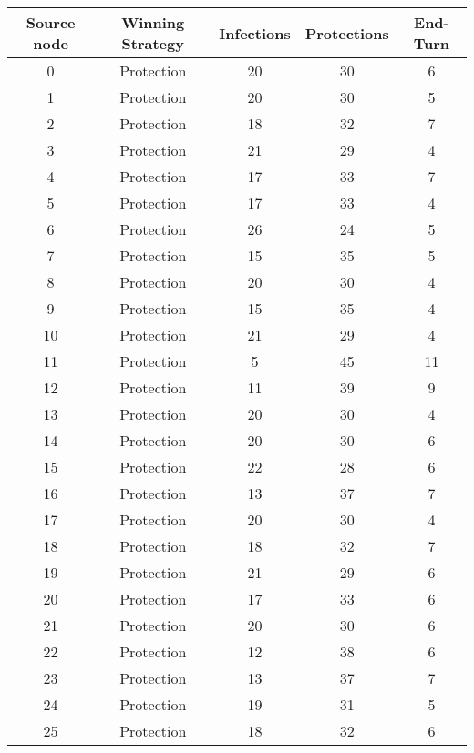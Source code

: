 \documentclass[results.tex]{subfiles}
\begin{document}
\begin{center}
  \begin{tabular}{| c || c | c | c | c |}
    \hline
    {\bfseries Source node} & {\bfseries Winning Strategy} & {\bfseries Infections} & {\bfseries Protections} & {\bfseries End-Turn} \\  %
    \hline\hline
    0 & Protection & 20 & 30 & 6 \\ 
    \hline
    1 & Protection & 20 & 30 & 5 \\ 
    \hline
    2 & Protection & 18 & 32 & 7 \\ 
    \hline
    3 & Protection & 21 & 29 & 4 \\ 
    \hline
    4 & Protection & 17 & 33 & 7 \\ 
    \hline
    5 & Protection & 17 & 33 & 4 \\ 
    \hline
    6 & Protection & 26 & 24 & 5 \\ 
    \hline
    7 & Protection & 15 & 35 & 5 \\ 
    \hline
    8 & Protection & 20 & 30 & 4 \\ 
    \hline
    9 & Protection & 15 & 35 & 4 \\ 
    \hline
    10 & Protection & 21 & 29 & 4 \\ 
    \hline
    11 & Protection & 5 & 45 & 11 \\ 
    \hline
    12 & Protection & 11 & 39 & 9 \\ 
    \hline
    13 & Protection & 20 & 30 & 4 \\ 
    \hline
    14 & Protection & 20 & 30 & 6 \\ 
    \hline
    15 & Protection & 22 & 28 & 6 \\ 
    \hline
    16 & Protection & 13 & 37 & 7 \\ 
    \hline
    17 & Protection & 20 & 30 & 4 \\ 
    \hline
    18 & Protection & 18 & 32 & 7 \\ 
    \hline
    19 & Protection & 21 & 29 & 6 \\ 
    \hline
    20 & Protection & 17 & 33 & 6 \\ 
    \hline
    21 & Protection & 20 & 30 & 6 \\ 
    \hline
    22 & Protection & 12 & 38 & 6 \\ 
    \hline
    23 & Protection & 13 & 37 & 7 \\ 
    \hline
    24 & Protection & 19 & 31 & 5 \\ 
    \hline
    25 & Protection & 18 & 32 & 6 \\ 

\end{tabular}
\end{center}
\end{document}
